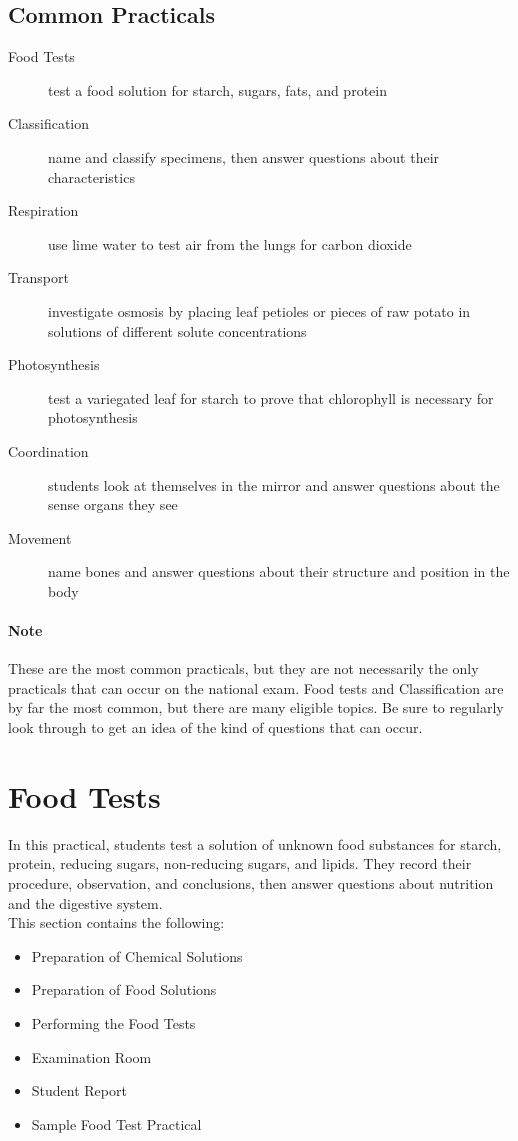 \subsection{Common Practicals}
\begin{description}
\item[Food Tests]{test a food solution for starch, sugars, fats, and protein}
\item[Classification]{name and classify specimens, then answer questions about their characteristics}
\item[Respiration]{use lime water to test air from the lungs for carbon dioxide}
\item[Transport]{investigate osmosis by placing leaf petioles or pieces of raw potato in solutions of different solute concentrations}
\item[Photosynthesis]{test a variegated leaf for starch to prove that chlorophyll is necessary for photosynthesis}
\item[Coordination]{students look at themselves in the mirror and answer questions about the sense organs they see}
\item[Movement]{name bones and answer questions about their structure and position in the body}
\end{description}

\paragraph{Note} These are the most common practicals, but they are not necessarily the only practicals that can occur on the national exam. Food tests and Classification are by far the most common, but there are many eligible topics. Be sure to regularly look through  to get an idea of the kind of questions that can occur.

\section{Food Tests}

In this practical, students test a solution of unknown food substances for starch, protein, reducing sugars, non-reducing sugars, and lipids. They record their procedure, observation, and conclusions, then answer questions about nutrition and the digestive system.\\

\noindent This section contains the following:
\begin{itemize}
\item{Preparation of Chemical Solutions}
\item{Preparation of Food Solutions}
\item{Performing the Food Tests}
\item{Examination Room}
\item{Student Report}
\item{Sample Food Test Practical}
\end{itemize}


